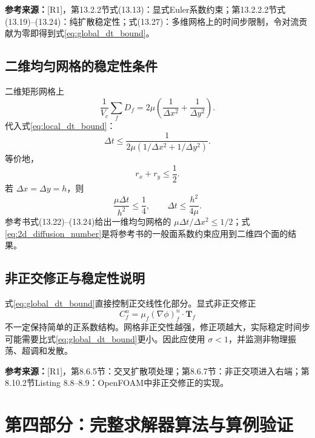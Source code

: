 \documentclass[UTF8,12pt,a4paper]{ctexart}
\numberwithin{equation}{section}
\newcommand{\Rone}{\textnormal{[R1]}}
\newcommand{\source}[1]{%
  \par\smallskip
  \noindent\colorbox{sourcebg}{%
    \parbox{0.955\linewidth}{\raggedright\footnotesize\color{sourcegray}\textbf{参考来源：}#1}%
  }
  \par\smallskip
}
\newcommand{\Tf}{\bm T}
\begin{document}
\source{\Rone，第13.2.2节式(13.13)：显式Euler系数约束；第13.2.2.2节式(13.19)--(13.24)：纯扩散稳定性；式(13.27)：多维网格上的时间步限制，令对流贡献为零即得到式\eqref{eq:global_dt_bound}。}

\subsection{二维均匀网格的稳定性条件}

二维矩形网格上
\begin{equation}
  \frac{1}{V_c}\sum_fD_f
  =2\mu\left(\frac{1}{\Delta x^2}+\frac{1}{\Delta y^2}\right).
  \label{eq:rect_sum_D}
\end{equation}
代入式\eqref{eq:local_dt_bound}：
\begin{equation}
  \boxed{
  \Delta t\leq
  \frac{1}{2\mu(1/\Delta x^2+1/\Delta y^2)}}.
  \label{eq:2d_dt_bound}
\end{equation}
等价地，
\begin{equation}
  \boxed{r_x+r_y\leq\frac12}.
  \label{eq:2d_diffusion_number}
\end{equation}
若 $\Delta x=\Delta y=h$，则
\begin{equation}
  \boxed{
  \frac{\mu\Delta t}{h^2}\leq\frac14,
  \qquad
  \Delta t\leq\frac{h^2}{4\mu}}.
  \label{eq:square_dt_bound}
\end{equation}
参考书式(13.22)--(13.24)给出一维均匀网格的 $\mu\Delta t/\Delta x^2\leq1/2$；式\eqref{eq:2d_diffusion_number}是将参考书的一般面系数约束应用到二维四个面的结果。

\subsection{非正交修正与稳定性说明}

式\eqref{eq:global_dt_bound}直接控制正交线性化部分。显式非正交修正
\begin{equation}
  C_f^n=\mu_f(\nabla\phi)_f^n\cdot\Tf_f
\end{equation}
不一定保持简单的正系数结构。网格非正交性越强，修正项越大，实际稳定时间步可能需要比式\eqref{eq:global_dt_bound}更小。因此应使用 $\sigma<1$，并监测非物理振荡、超调和发散。

\source{\Rone，第8.6.5节：交叉扩散项处理；第8.6.7节：非正交项进入右端；第8.10.2节Listing 8.8--8.9：OpenFOAM中非正交修正的实现。}

\newpage
\section{第四部分：完整求解器算法与算例验证}
\end{document}
